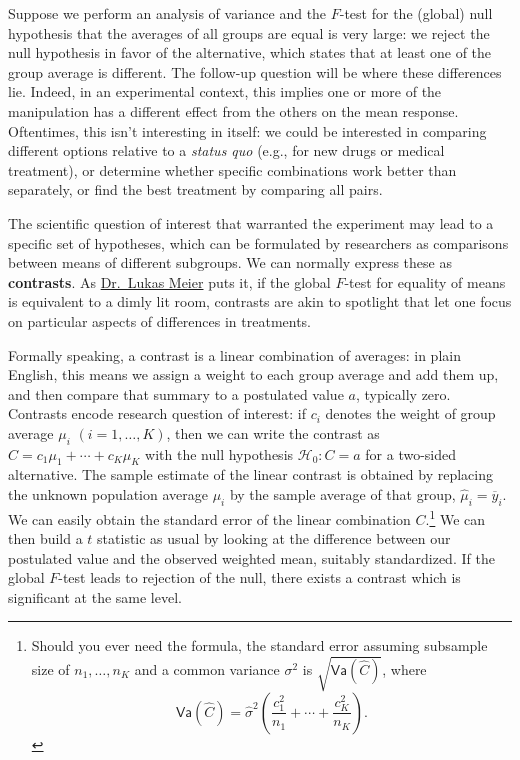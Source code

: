 \documentclass[
  11pt,
  letterpaper,
]{scrbook}
\theoremstyle{definition}
\theoremstyle{remark}
\begin{document}
Suppose we perform an analysis of variance and the \(F\)-test for the
(global) null hypothesis that the averages of all groups are equal is
very large: we reject the null hypothesis in favor of the alternative,
which states that at least one of the group average is different. The
follow-up question will be where these differences lie. Indeed, in an
experimental context, this implies one or more of the manipulation has a
different effect from the others on the mean response. Oftentimes, this
isn't interesting in itself: we could be interested in comparing
different options relative to a \emph{status quo} (e.g., for new drugs
or medical treatment), or determine whether specific combinations work
better than separately, or find the best treatment by comparing all
pairs.

The scientific question of interest that warranted the experiment may
lead to a specific set of hypotheses, which can be formulated by
researchers as comparisons between means of different subgroups. We can
normally express these as \textbf{contrasts}. As
\href{https://stat.ethz.ch/~meier}{Dr.~Lukas Meier} puts it, if the
global \(F\)-test for equality of means is equivalent to a dimly lit
room, contrasts are akin to spotlight that let one focus on particular
aspects of differences in treatments.

Formally speaking, a contrast is a linear combination of averages: in
plain English, this means we assign a weight to each group average and
add them up, and then compare that summary to a postulated value \(a\),
typically zero. Contrasts encode research question of interest: if
\(c_i\) denotes the weight of group average \(\mu_i\)
\((i=1, \ldots, K)\), then we can write the contrast as
\(C = c_1 \mu_1 + \cdots + c_K \mu_K\) with the null hypothesis
\(\mathscr{H}_0: C=a\) for a two-sided alternative. The sample estimate
of the linear contrast is obtained by replacing the unknown population
average \(\mu_i\) by the sample average of that group,
\(\widehat{\mu}_i = \overline{y}_{i}\). We can easily obtain the
standard error of the linear combination \(C.\)\footnote{Should you ever
  need the formula, the standard error assuming subsample size of
  \(n_1, \ldots, n_K\) and a common variance \(\sigma^2\) is
  \(\sqrt{\mathsf{Va}(\widehat{C})}\), where
  \[\mathsf{Va}(\widehat{C}) = \widehat{\sigma}^2\left(\frac{c_1^2}{n_1} + \cdots + \frac{c_K^2}{n_K}\right).\]}
We can then build a \(t\) statistic as usual by looking at the
difference between our postulated value and the observed weighted mean,
suitably standardized. If the global \(F\)-test leads to rejection of
the null, there exists a contrast which is significant at the same
level.
\end{document}
